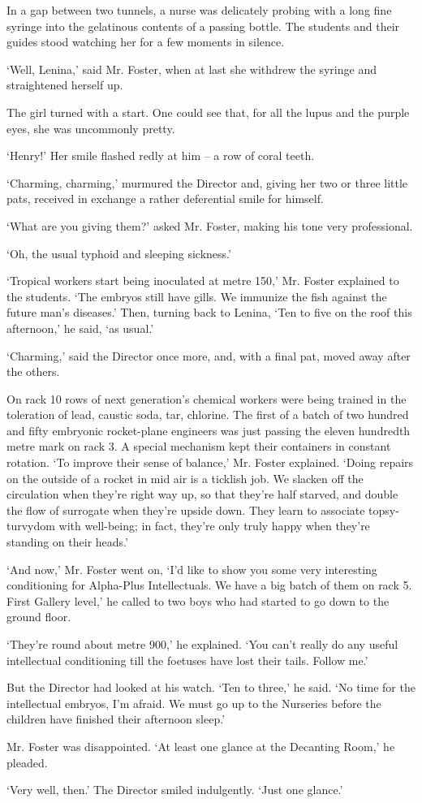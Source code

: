 \documentclass[12pt,a5paper]{book}
\newcommand{\sqm}[1]{‘#1’}
\begin{document}
In a gap between two tunnels, a nurse was delicately probing with a long fine syringe into the gelatinous contents of a passing bottle. The students and their guides stood watching her for a few moments in silence.

\sqm{Well, Lenina,} said Mr. Foster, when at last she withdrew the syringe and straightened herself up.

The girl turned with a start. One could see that, for all the lupus and the purple eyes, she was uncommonly pretty.

\sqm{Henry!} Her smile flashed redly at him – a row of coral teeth.

\sqm{Charming, charming,} murmured the Director and, giving her two or three little pats, received in exchange a rather deferential smile for himself.

\sqm{What are you giving them?} asked Mr. Foster, making his tone very professional.

\sqm{Oh, the usual typhoid and sleeping sickness.}

\sqm{Tropical workers start being inoculated at metre 150,} Mr. Foster explained to the students. \sqm{The embryos still have gills. We immunize the fish against the future man's diseases.} Then, turning back to Lenina, \sqm{Ten to five on the roof this afternoon,} he said, \sqm{as usual.}

\sqm{Charming,} said the Director once more, and, with a final pat, moved away after the others.

On rack 10 rows of next generation's chemical workers were being trained in the toleration of lead, caustic soda, tar, chlorine. The first of a batch of two hundred and fifty embryonic rocket-plane engineers was just passing the eleven hundredth metre mark on rack 3. A special mechanism kept their containers in constant rotation. \sqm{To improve their sense of balance,} Mr. Foster explained. \sqm{Doing repairs on the outside of a rocket in mid air is a ticklish job. We slacken off the circulation when they're right way up, so that they're half starved, and double the flow of surrogate when they're upside down. They learn to associate topsy-turvydom with well-being; in fact, they're only truly happy when they're standing on their heads.}

\sqm{And now,} Mr. Foster went on, \sqm{I'd like to show you some very interesting conditioning for Alpha-Plus Intellectuals. We have a big batch of them on rack 5. First Gallery level,} he called to two boys who had started to go down to the ground floor.

\sqm{They're round about metre 900,} he explained. \sqm{You can't really do any useful intellectual conditioning till the foetuses have lost their tails. Follow me.}

But the Director had looked at his watch. \sqm{Ten to three,} he said. \sqm{No time for the intellectual embryos, I'm afraid. We must go up to the Nurseries before the children have finished their afternoon sleep.}

Mr. Foster was disappointed. \sqm{At least one glance at the Decanting Room,} he pleaded.

\sqm{Very well, then.} The Director smiled indulgently. \sqm{Just one glance.}
\end{document}
